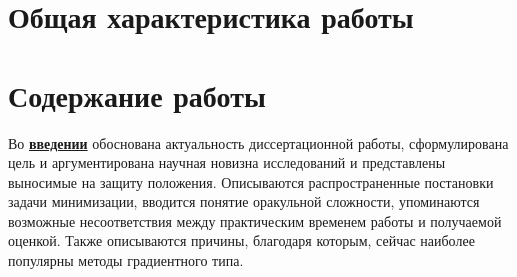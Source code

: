 \section*{Общая характеристика работы}

\newcommand{\actuality}{\pdfbookmark[1]{Актуальность}{actuality}\underline{\textbf{\actualityTXT}}}
\newcommand{\progress}{\pdfbookmark[1]{Разработанность темы}{progress}\underline{\textbf{\progressTXT}}}
\newcommand{\aim}{\pdfbookmark[1]{Цели}{aim}\underline{{\textbf\aimTXT}}}
\newcommand{\tasks}{\pdfbookmark[1]{Задачи}{tasks}\underline{\textbf{\tasksTXT}}}
\newcommand{\aimtasks}{\pdfbookmark[1]{Цели и задачи}{aimtasks}\aimtasksTXT}
\newcommand{\novelty}{\pdfbookmark[1]{Научная новизна}{novelty}\underline{\textbf{\noveltyTXT}}}
\newcommand{\influence}{\pdfbookmark[1]{Практическая значимость}{influence}\underline{\textbf{\influenceTXT}}}
\newcommand{\methods}{\pdfbookmark[1]{Методология и методы исследования}{methods}\underline{\textbf{\methodsTXT}}}
\newcommand{\defpositions}{\pdfbookmark[1]{Положения, выносимые на защиту}{defpositions}\underline{\textbf{\defpositionsTXT}}}
\newcommand{\reliability}{\pdfbookmark[1]{Достоверность}{reliability}\underline{\textbf{\reliabilityTXT}}}
\newcommand{\probation}{\pdfbookmark[1]{Апробация}{probation}\underline{\textbf{\probationTXT}}}
\newcommand{\contribution}{\pdfbookmark[1]{Личный вклад}{contribution}\underline{\textbf{\contributionTXT}}}
\newcommand{\publications}{\pdfbookmark[1]{Публикации}{publications}\underline{\textbf{\publicationsTXT}}}




\section*{Содержание работы}
Во \underline{\textbf{введении}} обоснована актуальность диссертационной работы, сформулирована цель и аргументирована научная новизна исследований и представлены выносимые на защиту положения. Описываются распространенные постановки задачи минимизации, вводится понятие оракульной сложности, упоминаются возможные несоответствия между практическим временем работы и получаемой оценкой. Также описываются причины, благодаря которым, сейчас наиболее популярны методы градиентного типа. 

